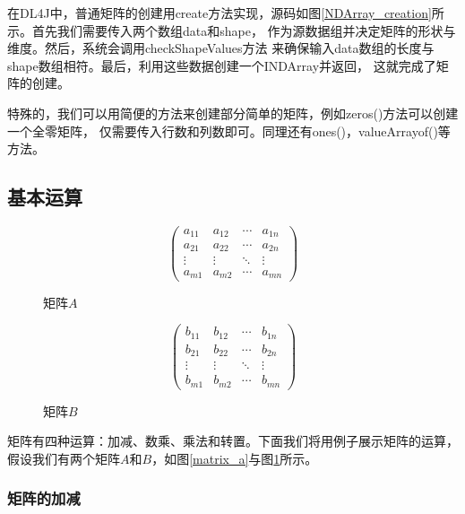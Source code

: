 在DL4J中，普通矩阵的创建用create方法实现，源码如图\ref{NDArray_creation}所示。首先我们需要传入两个数组data和shape，
作为源数据组并决定矩阵的形状与维度。然后，系统会调用checkShapeValues方法
来确保输入data数组的长度与shape数组相符。最后，利用这些数据创建一个INDArray并返回，
这就完成了矩阵的创建。

特殊的，我们可以用简便的方法来创建部分简单的矩阵，例如zeros()方法可以创建一个全零矩阵，
仅需要传入行数和列数即可。同理还有ones()，valueArrayof()等方法。


\subsection{基本运算}

\begin{figure}[!ht]
	\centering
	\begin{minipage}[c]{0.5\textwidth}
	\centering
		\begin{equation*}
	    \left( \begin{matrix}
        a_{11} & a_{12} & \cdots & a_{1n}\\
        a_{21} & a_{22} & \cdots & a_{2n}\\
        \vdots & \vdots & \ddots & \vdots\\
        a_{m1} & a_{m2} & \cdots & a_{mn}
        \end{matrix}
        \right )
		\end{equation*}
		\caption{矩阵$A$}
		\label{matrix_a}
	\end{minipage}%
	\begin{minipage}[c]{0.5\textwidth}
	\centering
    \begin{equation*}
	    \left( \begin{matrix}
        b_{11} & b_{12} & \cdots & b_{1n}\\
        b_{21} & b_{22} & \cdots & b_{2n}\\
        \vdots & \vdots & \ddots & \vdots\\
        b_{m1} & b_{m2} & \cdots & b_{mn}
        \end{matrix}
        \right )
		\end{equation*}
		\caption{矩阵$B$}
		\label{matrix_b}
	\end{minipage}
\end{figure}

矩阵有四种运算：加减、数乘、乘法和转置。下面我们将用例子展示矩阵的运算，
假设我们有两个矩阵$A$和$B$，如图\ref{matrix_a}与图\ref{matrix_b}所示。

\subsubsection{矩阵的加减}

